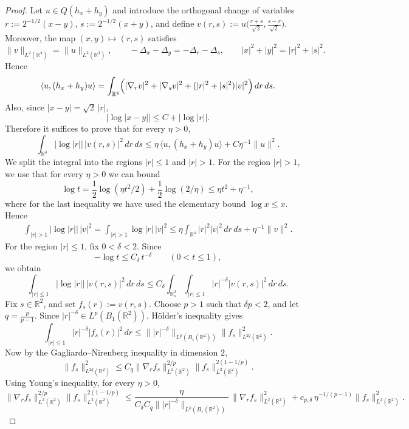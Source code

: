 \documentclass[11pt]{amsart}
\newcommand{\1}{\mathbbm{1}}
\newcommand{\R}{\mathbb{R}}
\theoremstyle{plain}
\theoremstyle{definition}
\theoremstyle{remark}
\numberwithin{equation}{section}
\begin{document}
\begin{proof}
Let \(u\in Q(h_x+h_y)\) and introduce the orthogonal change of variables
$r:=2^{-1/2}(x-y)$, $s:=2^{-1/2}(x+y)$, and define $v(r,s):=u\big(\frac{r+s}{\sqrt2},\frac{s-r}{\sqrt2}\big)$. Moreover, the map \((x,y)\mapsto(r,s)\) satisfies
\[
\|v\|_{L^2(\R^4)}=\|u\|_{L^2(\R^4)},
\qquad
-\Delta_x-\Delta_y=-\Delta_r-\Delta_s,
\qquad
|x|^2+|y|^2=|r|^2+|s|^2.
\]
Hence
\begin{equation}
\label{eq:energy-rs}
\langle u,(h_x+h_y)u\rangle
=
\int_{\R^4}\Bigl(|\nabla_r v|^2+|\nabla_s v|^2+(|r|^2+|s|^2)|v|^2\Bigr)\,dr\,ds.
\end{equation}
Also, since \(|x-y|=\sqrt2\,|r|\),
\[
|\log|x-y||
\le
C+|\log|r||.
\]
Therefore it suffices to prove that for every \(\eta>0\),
\begin{equation}
\label{eq:goal-r}
\int_{\R^4}|\log|r||\,|v(r,s)|^2\,dr\,ds
\le
\eta\,\langle u,(h_x+h_y)u\rangle + C \eta^{-1}\|u\|^2.
\end{equation}
We split the integral into the regions \(|r|\le 1\) and \(|r|>1\). For the region \(|r|>1\), we use that for every \(\eta>0\) we can bound
\[
\log t= \frac{1}{2}\log\left(\eta t^2/2\right) + \frac{1}{2}\log(2/\eta) \le \eta t^2 +  \eta^{-1},
\]
where for the last inequality we have used the elementary bound $\log x \le x.$
Hence
\begin{align}
\int_{|r|>1}|\log|r||\,|v|^2=
\int_{|r|>1}\log|r|\,|v|^2\le
\eta\int_{\R^4}|r|^2|v|^2\,dr\,ds
+
\eta^{-1}\|v\|^2.
\label{eq:large-r-log}
\end{align}
For the region \(|r|\le1\), fix \(0<\delta<2\). Since
\[
-\log t\le C_\delta\, t^{-\delta}
\qquad (0<t\le1),
\]
we obtain
\[
\int_{|r|\le1}|\log|r||\,|v(r,s)|^2\,dr\,ds
\le
C_\delta\int_{\R^2_s}\int_{|r|\le1}|r|^{-\delta}|v(r,s)|^2\,dr\,ds.
\]
Fix \(s\in\R^2\), and set \(f_s(r):=v(r,s)\). Choose \(p>1\) such that \(\delta p<2\), and let \(q=\frac{p}{p-1}\). Since \(|r|^{-\delta}\in L^p(B_1(\R^2))\), Hölder's inequality gives
\[
\int_{|r|\le1}|r|^{-\delta}|f_s(r)|^2\,dr
\le
\||r|^{-\delta}\|_{L^p(B_1(\R^2))}\|f_s\|_{L^{2q}(\R^2)}^2.
\]
Now by the Gagliardo--Nirenberg inequality in dimension \(2\),
\[
\|f_s\|_{L^{2q}(\R^2)}^2
\le
C_q\|\nabla_r f_s\|_{L^2(\R^2)}^{2/p}\|f_s\|_{L^2(\R^2)}^{2(1-1/p)}.
\]
Using Young's inequality, for every \(\eta>0\),
\[
\|\nabla_r f_s\|_{L^2(\mathbb{R}^2)}^{2/p}\|f_s\|_{L^2(\mathbb{R}^2)}^{2(1-1/p)}
\le
\frac{\eta}{C_\delta C_q\||r|^{-\delta}\|_{L^p(B_1(\R^2))}}\,\|\nabla_r f_s\|_{L^2(\mathbb{R}^2)}^2 + c_{p,\delta} \,\eta^{-1/(p-1)}\|f_s\|_{L^2(\mathbb{R}^2)}^2.
\]

\end{proof}
\end{document}
